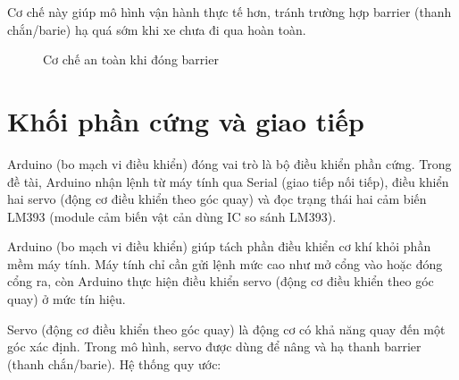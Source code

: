 \documentclass[a4paper,14pt]{extreport}
\begin{document}
Cơ chế này giúp mô hình vận hành thực tế hơn, tránh trường hợp barrier (thanh chắn/barie) hạ quá sớm khi xe chưa đi qua hoàn toàn.

\begin{figure}[H]
\centering
{}
\caption{Cơ chế an toàn khi đóng barrier}
\label{fig:dong_barrier}
\end{figure}

\section{Khối phần cứng và giao tiếp}

Arduino (bo mạch vi điều khiển) đóng vai trò là bộ điều khiển phần cứng. Trong đề tài, Arduino nhận lệnh từ máy tính qua Serial (giao tiếp nối tiếp), điều khiển hai servo (động cơ điều khiển theo góc quay) và đọc trạng thái hai cảm biến LM393 (module cảm biến vật cản dùng IC so sánh LM393).

Arduino (bo mạch vi điều khiển) giúp tách phần điều khiển cơ khí khỏi phần mềm máy tính. Máy tính chỉ cần gửi lệnh mức cao như mở cổng vào hoặc đóng cổng ra, còn Arduino thực hiện điều khiển servo (động cơ điều khiển theo góc quay) ở mức tín hiệu.

Servo (động cơ điều khiển theo góc quay) là động cơ có khả năng quay đến một góc xác định. Trong mô hình, servo được dùng để nâng và hạ thanh barrier (thanh chắn/barie). Hệ thống quy ước:
\end{document}
